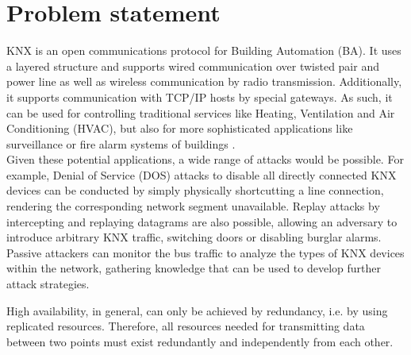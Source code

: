 \documentclass[a4paper,11pt,oneside]{memoir}
\begin{document}
\captionnamefont{\bfseries}

\frontmatter
{}





\section{Problem statement}

KNX is an open communications protocol for Building Automation (BA).
It uses a layered structure and supports wired communication over twisted pair
and power line as well as wireless communication by radio transmission. 
Additionally, it supports communication with TCP/IP hosts by special gateways. 
As such, it can be used for controlling traditional services like Heating, Ventilation and Air Conditioning (HVAC), but also for more
sophisticated applications 
like surveillance or fire alarm systems of buildings \cite{knxapps}.
\\
Given these potential applications, a wide range of attacks would be possible. For example, Denial of Service (DOS) attacks to disable all directly connected
KNX devices can be conducted by simply physically shortcutting a line
connection, rendering the corresponding network segment unavailable.
Replay attacks by intercepting and replaying datagrams are also possible, allowing an adversary to introduce arbitrary KNX traffic, switching doors
or disabling burglar alarms. Passive attackers can monitor the bus traffic to analyze the types of KNX devices within the network, gathering knowledge that can be used
to develop further attack strategies.

High availability, in general, can only be achieved by redundancy, i.e. by using replicated resources. Therefore, all
resources needed for transmitting data between two points must exist redundantly and independently from 
each other.
\end{document}
